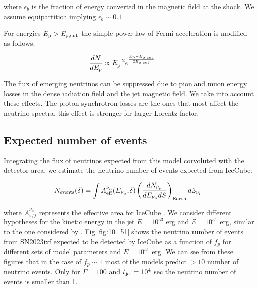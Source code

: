 \documentclass[twocolumn]{aastex631}
\begin{document}
{where $\epsilon_{b}$ is the fraction of energy converted in the magnetic field at the shock.  We assume equipartition implying  $\epsilon_{b}\sim 0.1$ 


For energies $E_{\rm p}>E_{\rm p,\rm cut}$ the simple power law of Fermi acceleration is modified as follows:

\begin{equation}
    \frac{dN}{dE_p} \propto E_{\rm p}^{-2} e^{\frac{E_{\rm p}-E_{\rm p,cut}}{2E_{\rm p, cut}}} \qquad
    \end{equation}

The flux of emerging neutrinos can be suppressed due to pion and muon energy losses in the dense radiation field and the jet magnetic field. We take into account these effects. The proton synchrotron losses are the ones that most affect the neutrino spectra, this effect is stronger for larger Lorentz factor.


\subsection{Expected number of events}

Integrating the flux of neutrinos expected from this model convoluted with the detector area, we estimate the neutrino number of events expected from IceCube:


\begin{equation}
\label{Eq:Nevents}
    N_{\rm events}(\delta)= \int A_{\rm eff}^{\nu_\mu} (E_{\nu_{\mu}},\delta) \left( \frac{dN_{\nu_\mu}}{dE_{\nu_\mu}dS} \right)_{\rm Earth} dE_{\nu_\mu} \, 
\end{equation}

where $A_{eff}^{\nu_{\mu}}$ represents the effective area for IceCube \cite{aeffI}. We consider 
different hypotheses for the kinetic energy in the jet 
$E=10^{53}$ erg and 
$E=10^{51}$ erg, similar to the one considered by \cite{Murase2011}. Fig.\ref{fig:10_51} 
shows the neutrino number of events from SN2023ixf expected to be detected by IceCube as a function of $f_p$ for different sets of model parameters and $E=10^{51}$ erg. We can see from these figures that in the case of $f_p\sim1$ most of the models predict $>10$ number of neutrino events. Only for $\Gamma=100$ and $t_{\rm jet}=10^4$ sec the neutrino number of events is smaller than 1.



}
\end{document}
